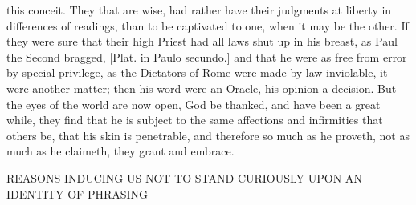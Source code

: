 {this conceit. They that are wise, had rather have their judgments at liberty in differences of readings, than to be captivated to one, when it may be the other. If they were sure that their high Priest had all laws shut up in his breast, as Paul the Second bragged, [Plat. in Paulo secundo.] and that he were as free from error by special privilege, as the Dictators of Rome were made by law inviolable, it were another matter; then his word were an Oracle, his opinion a decision. But the eyes of the world are now open, God be thanked, and have been a great while, they find that he is subject to the same affections and infirmities that others be, that his skin is penetrable, and therefore so much as he proveth, not as much as he claimeth, they grant and embrace.
\par }{\IS REASONS INDUCING US NOT TO STAND CURIOUSLY UPON AN IDENTITY OF PHRASING
}
